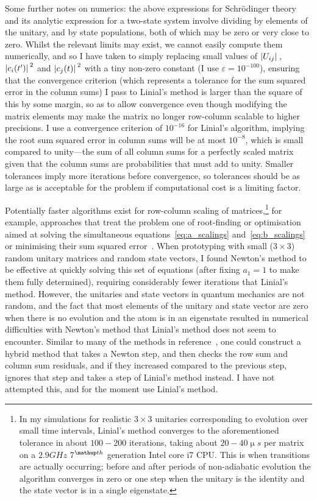 Some further notes on numerics: the above expressions for Schr\"odinger theory and its analytic expression for a two-state system involve dividing by elements of the unitary, and by state populations, both of which may be zero or very close to zero. Whilst the relevant limits may exist, we cannot easily compute them numerically, and so I have taken to simply replacing small values of $\abs{U_{ij}}$, $\abs{c_i(t^\prime)}^2$ and $\abs{c_j(t)}^2$ with a tiny non-zero constant (I use $\varepsilon=10^{-100}$), ensuring that the convergence criterion (which represents a tolerance for the sum squared error in the column sums) I pass to Linial's method is larger than the square of this by some margin, so as to allow convergence even though modifying the matrix elements may make the matrix no longer row-column scalable to higher precisions. I use a convergence criterion of $10^{-16}$ for Linial's algorithm, implying the root sum squared error in column sums will be at most $10^{-8}$, which is small compared to unity---the sum of all column sums for a perfectly scaled matrix given that the column sums are probabilities that must add to unity. Smaller tolerances imply more iterations before convergence, so tolerances should be as large as is acceptable for the problem if computational cost is a limiting factor.

Potentially faster algorithms exist for row-column scaling of matrices,\footnote{In my simulations for realistic $3\times3$ unitaries corresponding to evolution over small time intervals, Linial's method converges to the aforementioned tolerance in about $100-200$ iterations, taking about $20-40\unit{\upmu s}$ per matrix on a $2.9\unit{GHz}$ 7$^\up{th}$ generation Intel core i7 \textsc{CPU}. This is when transitions are actually occurring; before and after periods of non-adiabatic evolution the algorithm converges in zero or one step when the unitary is the identity and the state vector is in a single eigenstate.} for example, approaches that treat the problem one of root-finding or optimisation aimed at solving the simultaneous equations~\eqref{eq:a_scalings} and~\eqref{eq:b_scalings} or minimising their sum squared error~\cite{knight_fast_2013}. When prototyping with small ($3\times 3$) random unitary matrices and random state vectors, I found Newton's method to be effective at quickly solving this set of equations (after fixing $a_1=1$ to make them fully determined), requiring considerably fewer iterations that Linial's method. However, the unitaries and state vectors in quantum mechanics are not random, and the fact that most elements of the unitary and state vector are zero when there is no evolution and the atom is in an eigenstate resulted in numerical difficulties with Newton's method that Linial's method does not seem to encounter. Similar to many of the methods in reference~\cite{knight_fast_2013}, one could construct a hybrid method that takes a Newton step, and then checks the row sum and column sum residuals, and if they increased compared to the previous step, ignores that step and takes a step of Linial's method instead. I have not attempted this, and for the moment use Linial's method.

